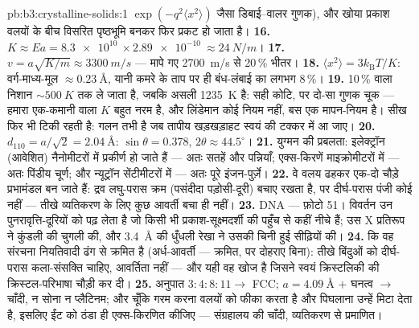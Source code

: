 \begin{solution}{pb:b3:crystalline-solids:1}
$\exp(-q^2\langle x^2\rangle)$ जैसा डिबाई--वालर गुणक), और खोया
प्रकाश वलयों के बीच विसरित पृष्ठभूमि बनकर फिर प्रकट हो जाता है।
\textbf{16.} $K \approx Ea = \qty{8.3e10}{}\times
\qty{2.89e-10}{} \approx \qty{24}{N/m}$।
\textbf{17.} $v = a\sqrt{K/m} \approx \qty{3300}{m/s}$ ---
मापे गए \qty{2700}{m/s} से 20\,\% भीतर।
\textbf{18.} $\langle x^2\rangle = 3k_{\text{B}}T/K$:
वर्ग-माध्य-मूल $\approx\qty{0.23}{\angstrom}$, यानी कमरे के ताप पर
ही बंध-लंबाई का लगभग 8\,\%।
\textbf{19.} 10\,\% वाला निशान $\sim\qty{500}{K}$ तक ले जाता है,
जबकि असली \qty{1235}{K} है: सही कोटि, पर दो-सा गुणक चूक
--- हमारा एक-कमानी वाला $K$ बहुत नरम है, और लिंडेमान कोई नियम नहीं,
बस एक मापन-नियम है। सीख फिर भी टिकी रहती है: गलन तभी है जब तापीय
खड़खड़ाहट स्वयं  की टक्कर में आ जाए।
\textbf{20.} $d_{110} = a/\sqrt2 = \qty{2.04}{\angstrom}$:
$\sin\theta = 0.378$, $2\theta \approx 44.5^\circ$।
\textbf{21.} युग्मन की प्रबलता: इलेक्ट्रॉन (आवेशित) नैनोमीटरों में
प्रकीर्ण हो जाते हैं --- अतः सतहें और पन्नियाँ; एक्स-किरणें
माइक्रोमीटरों में --- अतः पिंडीय चूर्ण; और न्यूट्रॉन सेंटीमीटरों में
--- अतः पूरे इंजन-पुर्ज़े।
\textbf{22.} वे वलय ढहकर एक-दो चौड़े प्रभामंडल बन जाते हैं:
द्रव लघु-परास क्रम (पसंदीदा पड़ोसी-दूरी) बचाए रखता है, पर
दीर्घ-परास पंजी कोई नहीं --- तीखे व्यतिकरण के लिए कुछ आवर्ती बचा ही
नहीं।
\textbf{23.} DNA --- फ़ोटो 51। विवर्तन उन पुनरावृत्ति-दूरियों को
पढ़ लेता है जो किसी भी प्रकाश-सूक्ष्मदर्शी की पहुँच से कहीं नीचे
हैं; उस X प्रतिरूप ने कुंडली की चुगली की, और
\qty{3.4}{\angstrom} की धुँधली रेखा ने उसकी चिनी हुई सीढ़ियों की।
\textbf{24.} कि वह संरचना नियतिवादी ढंग से क्रमित है
(अर्ध-आवर्ती --- क्रमित, पर दोहराए बिना): तीखे बिंदुओं को
दीर्घ-परास कला-संसक्ति चाहिए, आवर्तिता नहीं --- और यही वह खोज है
जिसने स्वयं क्रिस्टलिकी की क्रिस्टल-परिभाषा चौड़ी कर दी।
\textbf{25.} अनुपात $3:4:8:11 \to$ FCC; $a = \qty{4.09}{\angstrom}$
$+$ घनत्व $\to$ चाँदी, न सोना न प्लैटिनम; और चूँकि गरम करना वलयों को
फीका करता है और पिघलाना उन्हें मिटा देता है, इसलिए ईंट को ठंडा ही
एक्स-किरणित कीजिए --- संग्रहालय की चाँदी, व्यतिकरण से प्रमाणित।
\end{solution}
